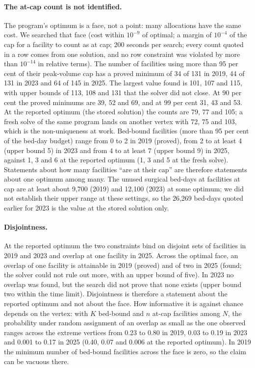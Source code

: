 \paragraph{The at-cap count is not identified.} The program's optimum is a face, not a point: many allocations have the same
cost. We searched that face (cost within $10^{-9}$ of optimal; a margin of $10^{-4}$ of the cap for a facility to count as at cap; 200 seconds per
search; every count quoted in a row comes from one solution, and no row constraint was violated by more than $10^{-14}$ in relative terms). The number of facilities using more than 95 per cent of their
peak-volume cap has a proved minimum of 34 of 131 in 2019, 44 of 131 in 2023 and 64 of 145 in 2025. The largest value found is 101, 107 and 115, with upper bounds of
113, 108 and 131 that the solver did not close. At 90 per cent the proved minimums are 39, 52 and 69, and at 99 per cent 31, 43 and 53. At the reported optimum (the stored solution) the counts are 79, 77 and 105; a fresh solve of the same program lands on another vertex with 72, 75 and 103, which is the non-uniqueness at work. Bed-bound facilities (more than 95 per cent of the
bed-day budget) range from 0 to 2 in 2019 (proved), from 2 to at least 4 (upper bound 5) in 2023 and from 4 to at least 7 (upper bound 9) in 2025, against 1, 3 and 6 at the reported optimum (1, 3 and 5 at the fresh solve). Statements about how many facilities ``are at their cap'' are therefore statements about one optimum among many. The unused surgical
bed-days at facilities at cap are at least about 9{,}700 (2019) and 12{,}100 (2023) at some optimum; we did not establish their upper range at these settings, so the 26{,}269 bed-days
quoted earlier for 2023 is the value at the stored solution only.

\paragraph{Disjointness.} At the reported optimum the two constraints bind on disjoint sets of facilities in 2019 and 2023 and overlap at one facility in 2025. Across the optimal
face, an overlap of one facility is attainable in 2019 (proved) and of two in 2025 (found; the solver could not rule out more, with an upper bound of five). In 2023 no overlap
was found, but the search did not prove that none exists (upper bound two within the time limit). Disjointness is therefore a statement about the reported optimum and not about
the face. How informative it is against chance depends on the vertex: with $K$ bed-bound and $n$ at-cap facilities among $N$, the probability under random assignment of an overlap as small as the one
observed ranges across the extreme vertices from 0.23 to 0.80 in 2019, 0.03 to 0.19 in 2023 and 0.001 to 0.17 in 2025 (0.40, 0.07 and 0.006 at the reported optimum). In 2019 the minimum number of
bed-bound facilities across the face is zero, so the claim can be vacuous there.

